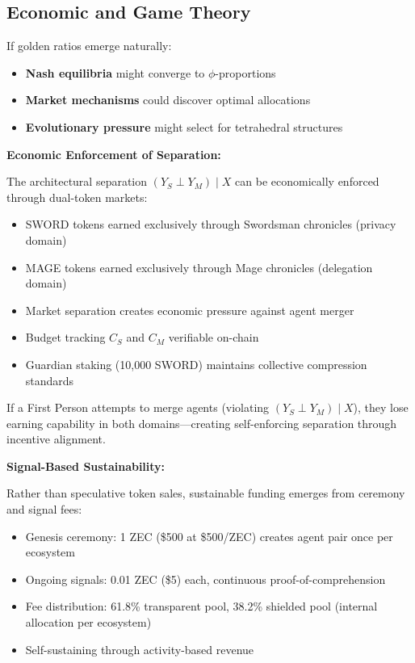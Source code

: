 \documentclass[11pt,a4paper]{article}
\theoremstyle{definition}
\newcommand{\given}{\mid}
\newcommand{\indep}{\perp}
\begin{document}
\subsection{Economic and Game Theory}

If golden ratios emerge naturally:

\begin{itemize}
    \item \textbf{Nash equilibria} might converge to $\phi$-proportions
    \item \textbf{Market mechanisms} could discover optimal allocations
    \item \textbf{Evolutionary pressure} might select for tetrahedral structures
\end{itemize}

\textbf{Economic Enforcement of Separation:}

The architectural separation $(Y_S \indep Y_M) \given X$ can be economically enforced through dual-token markets:

\begin{itemize}
    \item SWORD tokens earned exclusively through Swordsman chronicles (privacy domain)
    \item MAGE tokens earned exclusively through Mage chronicles (delegation domain)
    \item Market separation creates economic pressure against agent merger
    \item Budget tracking $C_S$ and $C_M$ verifiable on-chain
    \item Guardian staking (10,000 SWORD) maintains collective compression standards
\end{itemize}

If a First Person attempts to merge agents (violating $(Y_S \indep Y_M) \given X$), they lose earning capability in both domains---creating self-enforcing separation through incentive alignment.

\textbf{Signal-Based Sustainability:}

Rather than speculative token sales, sustainable funding emerges from ceremony and signal fees:

\begin{itemize}
    \item Genesis ceremony: 1 ZEC (\$500 at \$500/ZEC) creates agent pair once per ecosystem
    \item Ongoing signals: 0.01 ZEC (\$5) each, continuous proof-of-comprehension
    \item Fee distribution: 61.8\% transparent pool, 38.2\% shielded pool (internal allocation per ecosystem)
    \item Self-sustaining through activity-based revenue
\end{itemize}
\end{document}
